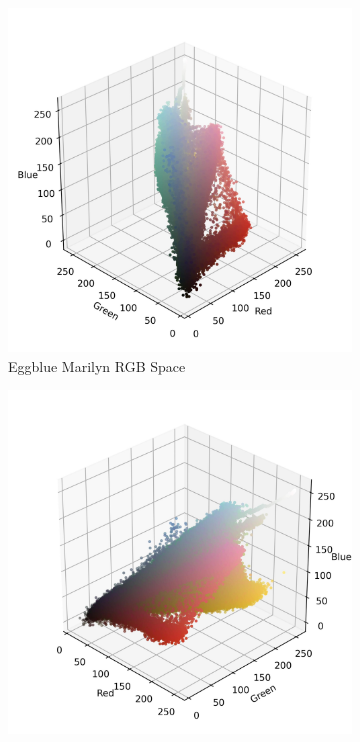 \documentclass{article}
\begin{document}
\begin{figure}[ht]\ContinuedFloat
  \centering
  \begin{subfigure}{0.45\textwidth}
    \includegraphics[width=\textwidth]{main_files/figure-latex/4_19_eggblue_marilyn_original_scatter.jpg}
    \caption{Eggblue Marilyn RGB Space}
    \label{fig:4_19_eggblue_marilyn_original_scatter}
  \end{subfigure}
  \hfill
  \begin{subfigure}{0.45\textwidth}
    \includegraphics[width=\textwidth]{main_files/figure-latex/4_20_eggblue_marilyn_original_scatter.jpg}

\end{subfigure}
\end{figure}
\end{document}
